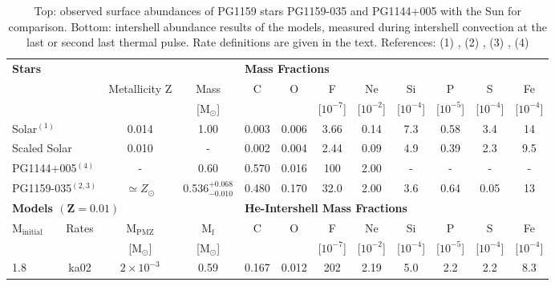 \begin{table}[p!]
  \begin{sideways}\centering
  \begin{minipage}{210mm}
  \caption[Observed surface abundances of PG1159 stars PG1159-035 and PG1144+005, the Sun, and intershell abundance results of the models]{Top: observed surface abundances of PG1159 stars PG1159-035 and PG1144+005 with the Sun for comparison.
\newline Bottom: intershell abundance results of the models, measured during intershell convection at the last or second last thermal pulse. Rate definitions are given in the text.
\newline References: (1) \citet{Asplund:2009eu}, (2) \citet{Jahn:2007ip}, (3) \citet{Werner:2011bl}, (4) \citet{Werner:2006bf}}\label{tbl:intershell-observations}
\begin{tabular}{l c c c c c c c c c c c}
\hline
\multicolumn{3}{l}{{\bf Stars}}					& 				& \multicolumn{8}{l}{{\bf Mass Fractions}}\\
 & & 	Metallicity Z									& Mass					&	C	& O		& F		& Ne	& Si		& P		& S		& Fe		\\
 & & 												& [M$_\odot$]				&		&		&[$10^{-7}$]&[$10^{-2}$]&[$10^{-4}$]&[$10^{-5}$]&[$10^{-4}$]&[$10^{-4}$]\\
\hline
\multicolumn{2}{l}{Solar$^{(1)}$}	& 0.014				& 1.00					& 0.003	& 0.006	& 3.66	& 0.14	& 7.3	& 0.58	& 3.4	& 14\\
\multicolumn{2}{l}{Scaled Solar}	& 0.010				& -						& 0.002	& 0.004	& 2.44	& 0.09	& 4.9	& 0.39	& 2.3	& 9.5\\ 
\multicolumn{2}{l}{PG1144+005$^{(4)}$}& -				& 0.60					& 0.570	& 0.016	& 100	& 2.00	& -		& -		& -		&  -	\\
\multicolumn{2}{l}{PG1159-035$^{(2,3)}$}& $\simeq Z_\odot$&0.536$_{-0.010}^{+0.068}$	& 0.480	& 0.170	& 32.0	& 2.00	& 3.6	& 0.64	& 0.05	& 13	\\
\hline
\multicolumn{3}{l}{{\bf Models $\mathbf{(Z=0.01)}$}}			&	& \multicolumn{8}{l}{{\bf He-Intershell Mass Fractions}}\\
M$_{\mathrm{initial}}$&Rates	& M$_{\mathrm{PMZ}}$	&M$_{\mathrm{f}}$				& C		& O		& F		& Ne	& Si		& P		& S		& Fe	\\
[0ex][M$_\odot$]		&			& [M$_\odot$]			&[M$_\odot$]				&		&		&[$10^{-7}$]&[$10^{-2}$]&[$10^{-4}$]&[$10^{-5}$]&[$10^{-4}$]&[$10^{-4}$]\\
\hline
1.8			& ka02		& $2\times10^{-3}$			& 0.59					& 0.167	& 0.012	& 202	& 2.19	& 5.0	& 2.2	& 2.2	& 8.3\\

\end{tabular}
\end{minipage}
\end{sideways}
\end{table}
